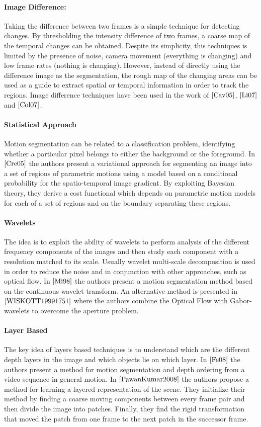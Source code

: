 \paragraph{Image Difference:} Taking the difference between two frames is a simple technique for detecting changes. By thresholding the intensity difference of two frames, a coarse map of the temporal changes can be obtained. Despite its simplicity, this techniques is limited by the presence of noise, camera movement (everything is changing) and low frame rates (nothing is changing). However, instead of directly using the difference image as the segmentation, the rough map of the changing areas can be used as a guide to extract spatial or temporal information in order to track the regions. Image difference techniques have been used in the work of $\cite{Cav05}$, $\cite{Li07}$ and $\cite{Col07}$.

\paragraph{Statistical Approach} Motion segmentation can be related to a classification problem, identifying whether a particular pixel belongs to either the background or the foreground. In $\cite{Cre05}$ the authors present a variational approach for segmenting an image into a set of regions of parametric motions using a model based on a conditional probability for the spatio-temporal image gradient. By exploiting Bayesian theory, they derive a cost functional which depends on parametric motion models for each  of a set of regions and on the boundary separating these regions.

\paragraph{Wavelets}
The idea is to exploit the ability of wavelets to perform analysis of the different frequency components of the images and then study each component with a resolution matched to its scale. Usually wavelet multi-scale decomposition is used in order to reduce the noise and in conjunction with other approaches, such as optical flow. In $\cite{Mi98}$ the authors present a motion segmentation method based on the continuous wavelet transform. An alternative method is presented in $\cite{WISKOTT19991751}$ where the authors combine the Optical Flow with Gabor-wavelets to overcome the aperture problem. 

\paragraph{Layer Based} The key idea of layers based techniques is to understand which are the different depth layers in the image and which objects lie on which layer. In $\cite{Fe08}$ the authors present a method for motion segmentation and depth ordering from a video sequence in general motion. In $\cite{PawanKumar2008}$ the authors propose a method for learning a layered representation of the scene. They initialize their method by finding a coarse moving components between every frame pair and then divide the image into patches. Finally, they find the rigid transformation that moved the patch from one frame to the next patch in the successor frame.

